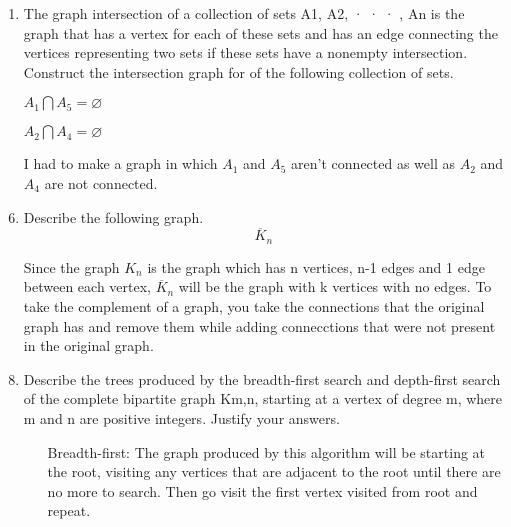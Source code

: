 \documentclass[letterpaper,11pt]{article}
\begin{document}
\begin{enumerate}
    \item The graph intersection of a collection of sets A1, A2, · · · , An is the graph that has a vertex for each of these
    sets and has an edge connecting the vertices representing two sets if these sets have a nonempty intersection.
    Construct the intersection graph for of the following collection of sets.
    \item[] $A_1 \bigcap A_5 = \varnothing$
    \item[] $A_2 \bigcap A_4 = \varnothing$ 
    \item[] I had to make a graph in which $A_1$ and $A_5$ aren't connected as well as $A_2$ and $A_4$ are not connected.
    \item[] 
    \item Describe the following graph. $$\overline{K}_n$$
    \item [] Since the graph $K_n$ is the graph which has n vertices, n-1 edges and 1 edge between each vertex, $\overline{K}_n$ will be the graph with k vertices with no edges. To take the complement of a graph, you take the connections that the original graph has and remove them while adding connecctions that were not present in the original graph.
    \item Describe the trees produced by the breadth-first search and depth-first search of the complete bipartite
    graph Km,n, starting at a vertex of degree m, where m and n are positive integers. Justify your answers.
    \begin{enumerate}
        \item [Breadth-first:] The graph produced by this algorithm will be starting at the root, visiting any vertices that are adjacent to the root until there are no more to search. Then go visit the first vertex visited from root and repeat.

\end{enumerate}
\end{enumerate}
\end{document}
